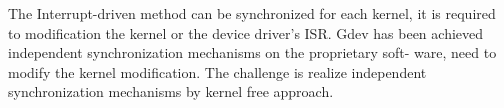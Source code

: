 The Interrupt-driven method can be synchronized for each kernel, it is required to modification the kernel or the device driver's ISR.
Gdev has been achieved independent synchronization mechanisms on the proprietary soft- ware, need to modify the kernel modification.
The challenge is realize independent synchronization mechanisms by kernel free approach.

